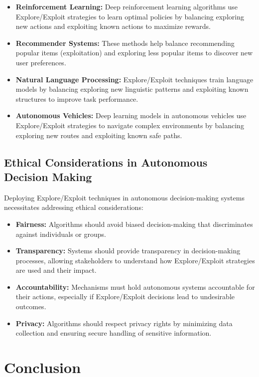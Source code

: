 \documentclass[12pt]{book} %
\begin{document}
\begin{itemize}
    \item \textbf{Reinforcement Learning:} Deep reinforcement learning algorithms use Explore/Exploit strategies to learn optimal policies by balancing exploring new actions and exploiting known actions to maximize rewards.
    \item \textbf{Recommender Systems:} These methods help balance recommending popular items (exploitation) and exploring less popular items to discover new user preferences.
    \item \textbf{Natural Language Processing:} Explore/Exploit techniques train language models by balancing exploring new linguistic patterns and exploiting known structures to improve task performance.
    \item \textbf{Autonomous Vehicles:} Deep learning models in autonomous vehicles use Explore/Exploit strategies to navigate complex environments by balancing exploring new routes and exploiting known safe paths.
\end{itemize}

\subsection{Ethical Considerations in Autonomous Decision Making}

Deploying Explore/Exploit techniques in autonomous decision-making systems necessitates addressing ethical considerations:

\begin{itemize}
    \item \textbf{Fairness:} Algorithms should avoid biased decision-making that discriminates against individuals or groups.
    \item \textbf{Transparency:} Systems should provide transparency in decision-making processes, allowing stakeholders to understand how Explore/Exploit strategies are used and their impact.
    \item \textbf{Accountability:} Mechanisms must hold autonomous systems accountable for their actions, especially if Explore/Exploit decisions lead to undesirable outcomes.
    \item \textbf{Privacy:} Algorithms should respect privacy rights by minimizing data collection and ensuring secure handling of sensitive information.
\end{itemize}

\section{Conclusion}
\end{document}
